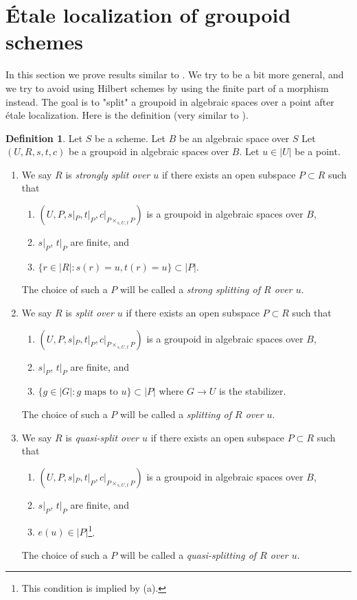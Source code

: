 \documentclass{stacks-project}
\theoremstyle{plain}
\theoremstyle{definition}
\newtheorem{definition}[subsection]{Definition}
\theoremstyle{remark}
\numberwithin{equation}{subsection}
\begin{document}
\section{\'Etale localization of groupoid schemes}
\label{section-etale-localize}

\noindent
In this section we prove results similar to \cite[Proposition 4.2]{K-M}.
We try to be a bit more general, and we try to avoid using Hilbert schemes
by using the finite part of a morphism instead.
The goal is to "split" a groupoid in algebraic spaces over a point
after \'etale localization. Here is the definition (very similar to
\cite[Definition 4.1]{K-M}).

\begin{definition}
\label{definition-split-at-point}
Let $S$ be a scheme. Let $B$ be an algebraic space over $S$
Let $(U, R, s, t, c)$ be a groupoid in algebraic spaces over $B$.
Let $u \in |U|$ be a point.
\begin{enumerate}
\item We say $R$ is {\it strongly split over $u$} if there exists an open
subspace $P \subset R$ such that
\begin{enumerate}
\item $(U, P, s|_P, t|_P, c|_{P \times_{s, U, t} P})$ is a
groupoid in algebraic spaces over $B$,
\item $s|_P$, $t|_P$ are finite, and
\item $\{r \in |R| : s(r) = u, t(r) = u\} \subset |P|$.
\end{enumerate}
The choice of such a $P$ will be called a
{\it strong splitting of $R$ over $u$}.
\item We say $R$ is {\it split over $u$} if there exists an open
subspace $P \subset R$ such that
\begin{enumerate}
\item $(U, P, s|_P, t|_P, c|_{P \times_{s, U, t} P})$ is a
groupoid in algebraic spaces over $B$,
\item $s|_P$, $t|_P$ are finite, and
\item $\{g \in |G| : g\text{ maps to }u\} \subset |P|$ where
$G \to U$ is the stabilizer.
\end{enumerate}
The choice of such a $P$ will be called a
{\it splitting of $R$ over $u$}.
\item We say $R$ is {\it quasi-split over $u$} if there exists an open
subspace $P \subset R$ such that
\begin{enumerate}
\item $(U, P, s|_P, t|_P, c|_{P \times_{s, U, t} P})$ is a
groupoid in algebraic spaces over $B$,
\item $s|_P$, $t|_P$ are finite, and
\item $e(u) \in |P|$\footnote{This condition is implied by (a).}.
\end{enumerate}
The choice of such a $P$ will be called a {\it quasi-splitting of $R$ over $u$}.
\end{enumerate}
\end{definition}
\end{document}

